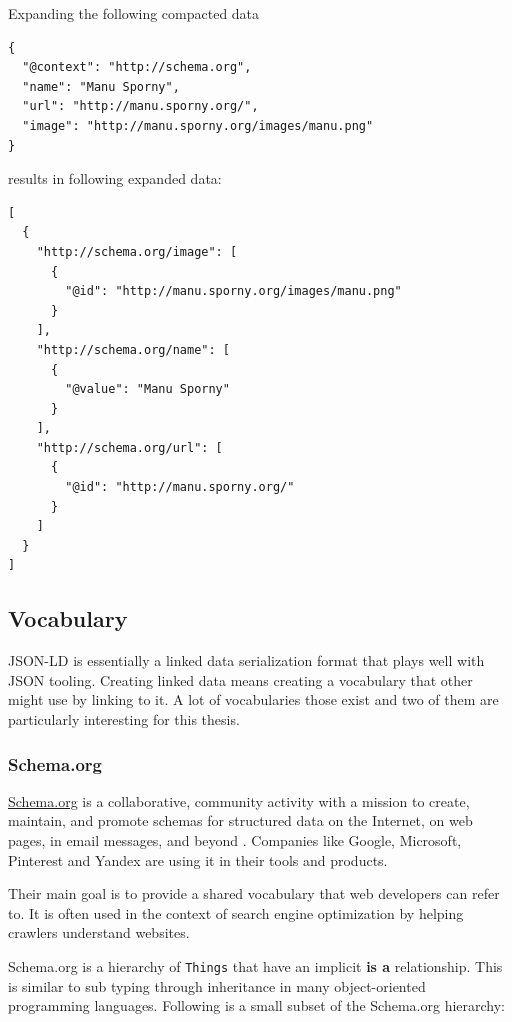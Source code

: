 Expanding the following compacted data

\lstset{language=JSON}
\begin{lstlisting}[caption=Compacted and easy-to-read data of a person]
{
  "@context": "http://schema.org",
  "name": "Manu Sporny",
  "url": "http://manu.sporny.org/",
  "image": "http://manu.sporny.org/images/manu.png"
}
\end{lstlisting}

results in following expanded data:

\lstset{language=JSON}
\begin{lstlisting}[caption=Expanded data of a person that is easy to process for machines]
[
  {
    "http://schema.org/image": [
      {
        "@id": "http://manu.sporny.org/images/manu.png"
      }
    ],
    "http://schema.org/name": [
      {
        "@value": "Manu Sporny"
      }
    ],
    "http://schema.org/url": [
      {
        "@id": "http://manu.sporny.org/"
      }
    ]
  }
]
\end{lstlisting}

\subsection{Vocabulary}

JSON-LD is essentially a linked data serialization format that plays well with JSON tooling. Creating linked data means creating a vocabulary that other might use by linking to it. A lot of vocabularies those exist and two of them are particularly interesting for this thesis.

\subsubsection{Schema.org}

\url{Schema.org} is a collaborative, community activity with a mission to create, maintain, and promote schemas for structured data on the Internet, on web pages, in email messages, and beyond \citep{welcomeschemaorg}. Companies like Google, Microsoft, Pinterest and Yandex are using it in their tools and products.

Their main goal is to provide a shared vocabulary that web developers can refer to. It is often used in the context of search engine optimization by helping crawlers understand websites.

Schema.org is a hierarchy of \lstinline{Things} that have an implicit \textbf{is a} relationship. This is similar to sub typing through inheritance in many object-oriented programming languages. Following is a small subset of the Schema.org hierarchy:

